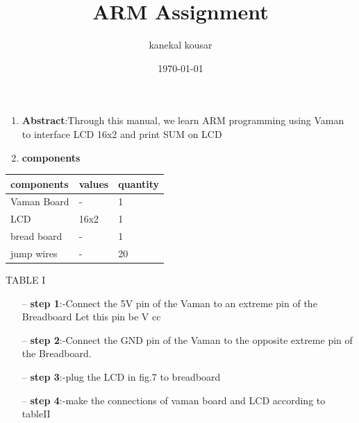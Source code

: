 \documentclass[twocolumn,13pt]{article}
\begin{document}
\title{\textbf{ARM Assignment}}

\author{kanekal kousar}
\date{\today}
\maketitle
\begin{enumerate}
    \item \textbf{Abstract}:Through this manual, we learn ARM programming using Vaman to interface LCD 16x2 and print SUM on LCD
    \item \textbf{components}
\end{enumerate}
     \begin{tabular}{ |p{3cm}|p{1.5cm}|p{1.5cm}| }
 \hline
 \setlength{\tabcolsep}{3pt}
components & values & quantity \\
\hline
 Vaman Board &   - & 1\\
 LCD &16x2 & 1\\
 bread board  &-& 1\\
 jump wires&  - & 20\\
 \hline
\end{tabular}
\begin{center}
    TABLE I
\end{center}

\begin{enumerate}
    \item[--] \textbf{step 1}:-Connect the 5V pin of the Vaman to an extreme pin of the Breadboard
Let this pin be V cc 
    \item[--] \textbf{step 2}:-Connect the GND pin of the Vaman to the opposite extreme pin of the Breadboard.
     \item[--] \textbf{step 3}:-plug the LCD in fig.7 to breadboard
    \item[--] \textbf{step 4}:-make the connections of vaman board and LCD according to tableII
   
\end{enumerate}
\end{document}
